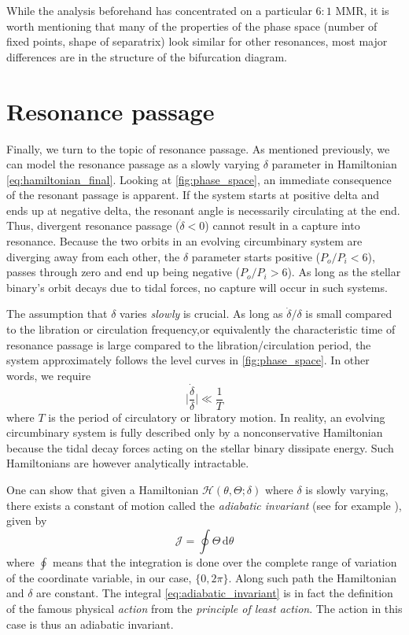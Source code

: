 \documentclass[twoside,openright,titlepage,numbers=noenddot,headinclude,%
                footinclude=true,cleardoublepage=empty,abstractoff, 
                BCOR=5mm,paper=a4,fontsize=11pt,%
                american,%
                ]{scrreprt}%
\begin{document}
While the analysis beforehand has concentrated on a particular $6:1$ MMR, it is 
worth mentioning 
that many of the properties of the phase space (number of fixed points, shape of
separatrix) look similar for other 
resonances, most major differences are in the structure of the bifurcation diagram.

\section{Resonance passage}
\label{sec:Resonance_passage}
Finally, we turn to the topic of resonance passage. As mentioned previously, we
can model the resonance passage as a slowly varying $\delta$ parameter in Hamiltonian 
\ref{eq:hamiltonian_final}. 
Looking at \cref{fig:phase_space}, an immediate consequence of the resonant
passage is apparent. If the system starts at positive delta and ends up at
negative delta, the resonant angle is necessarily circulating at the end. 
Thus, divergent
resonance passage ($\dot{\delta}<0$) cannot result in a capture into resonance.
Because the two orbits in an evolving circumbinary system
are diverging away from each other, the $\delta$ parameter starts positive 
($P_o/P_i<6$), passes through zero and end up being negative ($P_o/P_i>6$).
As long as the stellar binary's orbit decays due to tidal forces, no capture 
will occur in such systems.

The assumption that $\delta$ varies \emph{slowly} is crucial. As long as
$\dot{\delta}/\delta$ is small compared to the libration or circulation 
frequency,or equivalently the characteristic time of resonance passage
is large compared to the libration/circulation period, the system 
approximately follows the level curves in \cref{fig:phase_space}. In 
other words, we require 
\begin{equation}
    \bigg\lvert\frac{\dot{\delta}}{\delta}\bigg\rvert \ll \frac{1}{T} 
    \label{eq:adabatic_criterion}
\end{equation}
where $T$ is the period of circulatory or libratory motion.
In reality, an evolving circumbinary system is fully 
described only by a nonconservative Hamiltonian because the tidal decay
forces acting on the stellar binary dissipate energy. Such Hamiltonians
are however analytically intractable.

One can show that given a Hamiltonian $\mathcal{H}(\theta,\Theta;\delta)$
where $\delta$ is slowly varying, there exists a constant of motion
called the \emph{adiabatic invariant} (see for example \citet{landau}),
given by
\begin{equation}
    \mathcal{J}=\oint \Theta\,\mathrm{d}\theta    
    \label{eq:adiabatic_invariant}
\end{equation}
where $\oint$ means that the integration is done over the complete range
of variation of the coordinate variable, in our case, $\{0,2\pi\}$. Along
such  path the Hamiltonian and $\delta$ are constant. The integral
\ref{eq:adiabatic_invariant} is in fact the definition of the famous
physical \emph{action} from the \emph{principle of least action}. The action
in this case is thus an adiabatic invariant.
\end{document}
